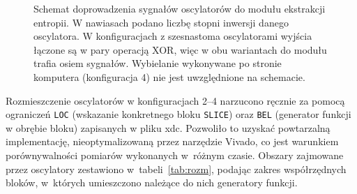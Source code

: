 \begin{figure}[htbp]
{%
    }
    \caption{Schemat doprowadzenia sygnałów oscylatorów do modułu ekstrakcji
    entropii. W nawiasach podano liczbę stopni inwersji danego oscylatora.
    W konfiguracjach z szesnastoma oscylatorami wyjścia łączone są w pary
    operacją XOR, więc w obu wariantach do modułu trafia osiem sygnałów.
    Wybielanie wykonywane po stronie komputera (konfiguracja 4) nie jest
    uwzględnione na schemacie.}
    \label{fig:ro-xor-schemat}
\end{figure}

Rozmieszczenie oscylatorów w konfiguracjach 2--4 narzucono ręcznie za pomocą ograniczeń
\texttt{LOC} (wskazanie konkretnego bloku \texttt{SLICE}) oraz \texttt{BEL} (generator funkcji w obrębie bloku) zapisanych w pliku xdc.
Pozwoliło to uzyskać powtarzalną implementację, nieoptymalizowaną przez narzędzie Vivado,
co jest warunkiem porównywalności pomiarów wykonanych w~różnym czasie.
Obszary zajmowane przez oscylatory zestawiono w~tabeli~\ref{tab:rozm},
podając zakres współrzędnych bloków, w~których umieszczono należące do nich generatory
funkcji.

